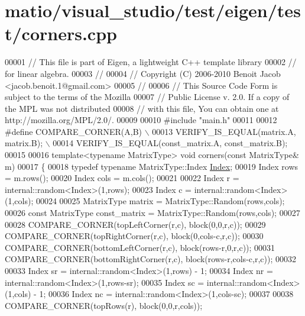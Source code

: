 \hypertarget{matio_2visual__studio_2test_2eigen_2test_2corners_8cpp_source}{}\section{matio/visual\+\_\+studio/test/eigen/test/corners.cpp}
\label{matio_2visual__studio_2test_2eigen_2test_2corners_8cpp_source}

\begin{DoxyCode}
00001 \textcolor{comment}{// This file is part of Eigen, a lightweight C++ template library}
00002 \textcolor{comment}{// for linear algebra.}
00003 \textcolor{comment}{//}
00004 \textcolor{comment}{// Copyright (C) 2006-2010 Benoit Jacob <jacob.benoit.1@gmail.com>}
00005 \textcolor{comment}{//}
00006 \textcolor{comment}{// This Source Code Form is subject to the terms of the Mozilla}
00007 \textcolor{comment}{// Public License v. 2.0. If a copy of the MPL was not distributed}
00008 \textcolor{comment}{// with this file, You can obtain one at http://mozilla.org/MPL/2.0/.}
00009 
00010 \textcolor{preprocessor}{#include "main.h"}
00011 
00012 \textcolor{preprocessor}{#define COMPARE\_CORNER(A,B) \(\backslash\)}
00013 \textcolor{preprocessor}{  VERIFY\_IS\_EQUAL(matrix.A, matrix.B); \(\backslash\)}
00014 \textcolor{preprocessor}{  VERIFY\_IS\_EQUAL(const\_matrix.A, const\_matrix.B);}
00015 
00016 \textcolor{keyword}{template}<\textcolor{keyword}{typename} MatrixType> \textcolor{keywordtype}{void} corners(\textcolor{keyword}{const} MatrixType& m)
00017 \{
00018   \textcolor{keyword}{typedef} \textcolor{keyword}{typename} MatrixType::Index \hyperlink{namespace_eigen_a62e77e0933482dafde8fe197d9a2cfde}{Index};
00019   Index rows = m.rows();
00020   Index cols = m.cols();
00021 
00022   Index r = internal::random<Index>(1,rows);
00023   Index c = internal::random<Index>(1,cols);
00024 
00025   MatrixType matrix = MatrixType::Random(rows,cols);
00026   \textcolor{keyword}{const} MatrixType const\_matrix = MatrixType::Random(rows,cols);
00027 
00028   COMPARE\_CORNER(topLeftCorner(r,c), block(0,0,r,c));
00029   COMPARE\_CORNER(topRightCorner(r,c), block(0,cols-c,r,c));
00030   COMPARE\_CORNER(bottomLeftCorner(r,c), block(rows-r,0,r,c));
00031   COMPARE\_CORNER(bottomRightCorner(r,c), block(rows-r,cols-c,r,c));
00032 
00033   Index sr = internal::random<Index>(1,rows) - 1;
00034   Index nr = internal::random<Index>(1,rows-sr);
00035   Index sc = internal::random<Index>(1,cols) - 1;
00036   Index nc = internal::random<Index>(1,cols-sc);
00037 
00038   COMPARE\_CORNER(topRows(r), block(0,0,r,cols));

\end{DoxyCode}
